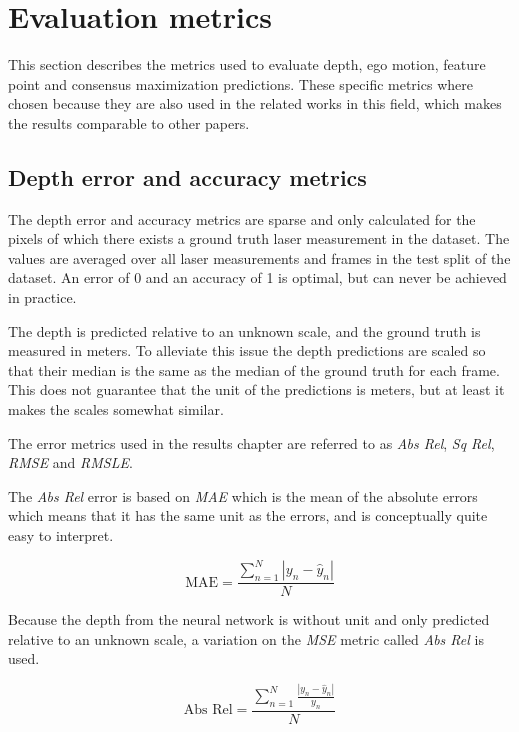 \section{Evaluation metrics}\label{sec:metrics}

This section describes the metrics used to evaluate depth, ego motion, feature point and consensus maximization predictions. These specific metrics where chosen because they are also used in the related works in this field, which makes the results comparable to other papers.

\subsection{Depth error and accuracy metrics}
\label{sec:depthmetrics}

The depth error and accuracy metrics are sparse and only calculated for the pixels of which there exists a ground truth laser measurement in the dataset. The values are averaged over all laser measurements and frames in the test split of the dataset. An error of 0 and an accuracy of 1 is optimal, but can never be achieved in practice.

The depth is predicted relative to an unknown scale, and the ground truth is measured in meters. To alleviate this issue the depth predictions are scaled so that their median is the same as the median of the ground truth for each frame. This does not guarantee that the unit of the predictions is meters, but at least it makes the scales somewhat similar.

The error metrics used in the results chapter are referred to as \textit{Abs Rel}, \textit{Sq Rel}, \textit{RMSE} and \textit{RMSLE}.

The \textit{Abs Rel} error is based on \textit{MAE} which is the mean of the absolute errors which means that it has the same unit as the errors, and is conceptually quite easy to interpret.

\begin{equation}
\textrm{MAE}=\frac{\sum^N_{n=1}{|y_n-\hat{y}_n|}}{N}
\end{equation}

Because the depth from the neural network is without unit and only predicted relative to an unknown scale, a variation on the \textit{MSE} metric called \textit{Abs Rel} is used.

\begin{equation}
\textrm{Abs Rel}=\frac{\sum^N_{n=1}{\frac{|y_n-\hat{y}_n|}{y_n}}}{N}
\end{equation}


